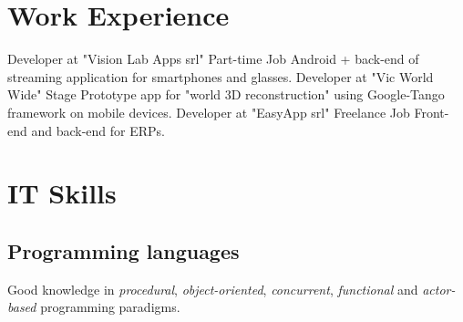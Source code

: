 \documentclass[letterpaper]{twentysecondcv} %
\begin{document}


\section{Work Experience}

\begin{twenty} %
		{Developer at "Vision Lab Apps srl"\footnotemark[3]}	{Part-time Job}
		{Android + back-end of streaming application for smartphones and glasses.}
		{Developer at "Vic World Wide"\footnotemark[4]}	{Stage}
		{Prototype app for "world 3D reconstruction" using Google-Tango framework on mobile devices.}
		{Developer at "EasyApp srl"\footnotemark[5]}	{Freelance Job}
		{Front-end and back-end  for ERPs.}
\end{twenty}




\section{IT Skills}

\subsection{Programming languages}

Good knowledge in \textit{procedural}, \textit{object-oriented}, \textit{concurrent}, \textit{functional} and \textit{actor-based} programming paradigms.
\end{document}
